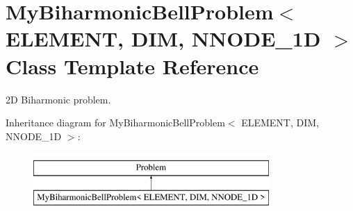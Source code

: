 \hypertarget{classMyBiharmonicBellProblem}{}\section{My\+Biharmonic\+Bell\+Problem$<$ E\+L\+E\+M\+E\+NT, D\+IM, N\+N\+O\+D\+E\+\_\+1D $>$ Class Template Reference}
\label{classMyBiharmonicBellProblem}


2D Biharmonic problem.  


Inheritance diagram for My\+Biharmonic\+Bell\+Problem$<$ E\+L\+E\+M\+E\+NT, D\+IM, N\+N\+O\+D\+E\+\_\+1D $>$\+:\begin{figure}[H]
\begin{center}
\leavevmode
\includegraphics[height=2.000000cm]{classMyBiharmonicBellProblem}
\end{center}
\end{figure}
